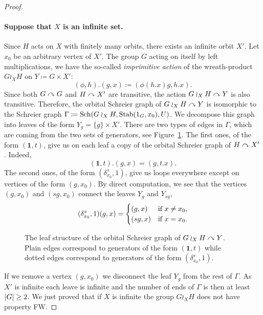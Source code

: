 \begin{lem}
\begin{proof}
\paragraph{Suppose that $X$ is an infinite set.}
Since $H$ acts on $X$ with finitely many orbits, there exists an infinite orbit $X'$.
Let $x_0$ be an arbitrary vertex of $X'$.
The group $G$ acting on itself by left multiplications, we have the so-called \emph{imprimitive action} of the wreath-product $G\wr_XH$ on $Y\coloneqq G\times X'$:
\begin{equation*}
(\phi,h). (g,x) \coloneqq (\phi(h.x)g, h.x).
\end{equation*}
Since both $G\curvearrowright G$ and $H\curvearrowright X'$ are transitive, the action $G\wr_XH\curvearrowright Y$ is also transitive. 
Therefore, the orbital Schreier graph of $G\wr_XH\curvearrowright Y$ is isomorphic to the Schreier graph $\Gamma\coloneqq\operatorname{Sch}(G\wr_XH, \operatorname{Stab}(1_G,x_0), U)$. We decompose this graph into leaves of the form $Y_g = \{ g \} \times X'$. There are two types of edges in $\Gamma$, which are coming from the two sets of generators, see Figure~\ref{Figure:Leaves}. The first ones, of the form $(\mathbf 1,t)$, give us on each leaf a copy of the orbital Schreier graph of $H \curvearrowright X'$. Indeed,
\begin{equation*}
(\mathbf 1,t).(g,x) = (g, t.x).
\end{equation*}
The second ones, of the form $(\delta_{x_0}^s,1)$, give us loops everywhere except on vertices of the form $(g,x_0)$. By direct computation, we see that the vertices $(g,x_0)$ and $(sg,x_0)$ connect the leaves $Y_g$ and $Y_{sg}$, 
\begin{equation*}
(\delta_{x_0}^s,1)(g,x) = 
\begin{cases}
(g,x) & \textnormal{if }x \neq x_0, \\
(sg, x) & \textnormal{if }x = x_0.
\end{cases}
\end{equation*}
%
\begin{figure}[H]\centering
\scalebox{0.7}{
}
\caption{The leaf structure of the orbital Schreier graph of $G\wr_XH \curvearrowright Y$. Plain edges correspond to generators of the form $(\mathbf 1,t)$ while dotted edges correspond to generators of the form $(\delta_{x_0}^s,1)$.}
\label{Figure:Leaves}
\end{figure}
%
If we remove a vertex $(g,x_0)$ we disconnect the leaf $Y_g$ from the rest of $\Gamma$. As $X'$ is infinite each leave is infinite and the number of ends of $\Gamma$ is then at least $\lvert G\rvert\geq 2$. We just proved that if $X$ is infinite the group $G\wr_XH$ does not have property FW.


\end{proof}
\end{lem}
